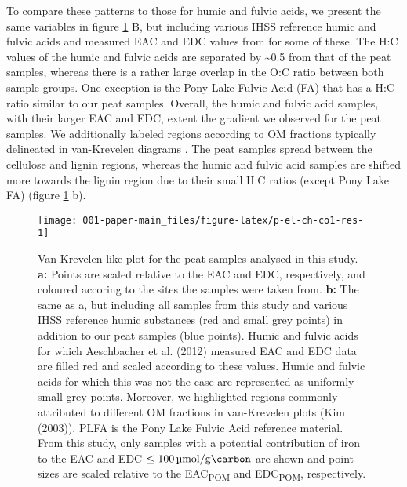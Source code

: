 \documentclass[draft,linenumbers]{agujournal2018}
\begin{document}
To compare these patterns to those for humic and fulvic acids, we
present the same variables in figure \ref{fig:p-el-ch-co1-res} B, but
including various IHSS reference humic and fulvic acids and measured EAC
and EDC values from \citet{Aeschbacher.2012} for some of these. The H:C
values of the humic and fulvic acids are separated by \textasciitilde0.5
from that of the peat samples, whereas there is a rather large overlap
in the O:C ratio between both sample groups. One exception is the Pony
Lake Fulvic Acid (FA) that has a H:C ratio similar to our peat samples.
Overall, the humic and fulvic acid samples, with their larger EAC and
EDC, extent the gradient we observed for the peat samples. We
additionally labeled regions according to OM fractions typically
delineated in van-Krevelen diagrams \citep{Kim.2003}. The peat samples
spread between the cellulose and lignin regions, whereas the humic and
fulvic acid samples are shifted more towards the lignin region due to
their small H:C ratios (except Pony Lake FA) (figure
\ref{fig:p-el-ch-co1-res} b).

\begin{figure}[H]

{\centering \texttt{[image: 001-paper-main\_files/figure-latex/p-el-ch-co1-res-1]} 

}

\caption{Van-Krevelen-like plot for the peat samples analysed in this study. \textbf{a:} Points are scaled relative to the EAC and EDC, respectively, and coloured accoring to the sites the samples were taken from. \textbf{b:} The same as a, but including all samples from this study and various IHSS reference humic substances (red and small grey points) in addition to our peat samples (blue points). Humic and fulvic acids for which Aeschbacher et al. (2012) measured EAC and EDC data are filled red and scaled according to these values. Humic and fulvic acids for which this was not the case are represented as uniformly small grey points. Moreover, we highlighted regions commonly attributed to different OM fractions in van-Krevelen plots (Kim (2003)). PLFA is the Pony Lake Fulvic Acid reference material. From this study, only samples with a potential contribution of iron to the EAC and EDC $\le\SI{100}{\micro\mol\per\gram\carbon}$ are shown and point sizes are scaled relative to the EAC\textsubscript{POM} and EDC\textsubscript{POM}, respectively.}\label{fig:p-el-ch-co1-res}
\end{figure}
\end{document}
